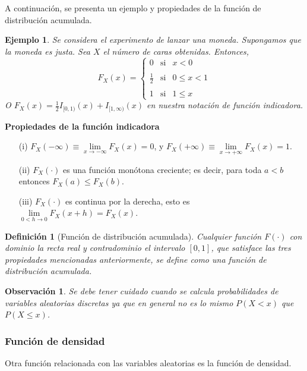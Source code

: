 \documentclass[12pt]{article}
\newtheorem*{remark}{Observación}
\newtheorem*{example}{Ejemplo}
\newtheorem{definition}{Definición}
\begin{document}
A continuación, se presenta un ejemplo y propiedades de la función de distribución acumulada.
\begin{example}
    Se considera el experimento de lanzar una moneda. Supongamos que la moneda es justa. Sea $X$ el número de caras obtenidas. Entonces,
    $$F_X(x)=\left\{ \begin{array}{lcc} 0 & \text{si} & x<0\\ \\ \frac{1}{2} & \text{si} & 0\leq x<1 \\ \\1 & \text{si} & 1\leq x \end{array} \right. $$
O $F_X(x)=\frac{1}{2}I_{[0,1)}(x)+ I_{[1,\infty)}(x)$ en nuestra notación de función indicadora.
\end{example}

\textbf{Propiedades de la función indicadora}
\begin{itemize}
    \item[(i)] $F_X(-\infty)\equiv \lim\limits_{x\to-\infty} F_X(x)=0$, y $F_X(+\infty)\equiv \lim\limits_{x\to+\infty} F_X(x)=1$.
    \item[(ii)] $F_X(\cdot)$ es una función monótona creciente; es decir, para toda $a< b$ entonces $F_X(a)\leq F_X(b)$.
    \item[(iii)] $F_X(\cdot)$ es continua por la derecha, esto es $\lim\limits_{0<h\to 0} F_X(x+h)=F_X(x)$. 
\end{itemize}


\begin{definition}[Función de distribución acumulada]
    Cualquier función $F(\cdot)$ con dominio la recta real y contradominio el intervalo $[0,1]$, que satisface las tres propiedades mencionadas anteriormente, se define como una función de distribución acumulada.
\end{definition}


\begin{remark}
    Se debe tener cuidado cuando se calcula probabilidades de variables aleatorias discretas ya que en general no es lo mismo $P(X< x)$ que $P(X\leq x)$.
\end{remark}

\subsubsection{Función de densidad}
Otra función relacionada con las variables aleatorias es la función de densidad.\\
\end{document}
